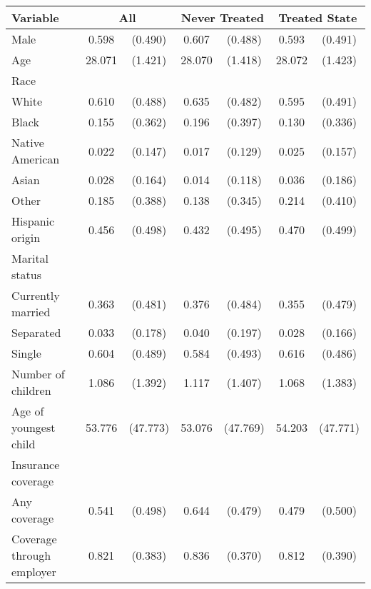 \begin{tabular}{lcccccc}
\toprule
\toprule
 Variable & \multicolumn{2}{c}{All} & \multicolumn{2}{c}{Never Treated} & \multicolumn{2}{c}{Treated State} \\
\midrule 
 Male  & 0.598 & (0.490)  & 0.607 & (0.488)  & 0.593 & (0.491)  \\
 Age  & 28.071 & (1.421)  & 28.070 & (1.418)  & 28.072 & (1.423)  \\
 Race  & & &  \\
 \hspace{0.3cm}  White  & 0.610 & (0.488)  & 0.635 & (0.482)  & 0.595 & (0.491)  \\
 \hspace{0.3cm}  Black  & 0.155 & (0.362)  & 0.196 & (0.397)  & 0.130 & (0.336)  \\
 \hspace{0.3cm}  Native American  & 0.022 & (0.147)  & 0.017 & (0.129)  & 0.025 & (0.157)  \\
 \hspace{0.3cm}  Asian  & 0.028 & (0.164)  & 0.014 & (0.118)  & 0.036 & (0.186)  \\
 \hspace{0.3cm}  Other  & 0.185 & (0.388)  & 0.138 & (0.345)  & 0.214 & (0.410)  \\
 Hispanic origin  & 0.456 & (0.498)  & 0.432 & (0.495)  & 0.470 & (0.499)  \\
 Marital status  & & &  \\
 \hspace{0.3cm} Currently married  & 0.363 & (0.481)  & 0.376 & (0.484)  & 0.355 & (0.479)  \\
 \hspace{0.3cm} Separated  & 0.033 & (0.178)  & 0.040 & (0.197)  & 0.028 & (0.166)  \\
 \hspace{0.3cm} Single  & 0.604 & (0.489)  & 0.584 & (0.493)  & 0.616 & (0.486)  \\
 Number of children  & 1.086 & (1.392)  & 1.117 & (1.407)  & 1.068 & (1.383)  \\
 Age of youngest child  & 53.776 & (47.773)  & 53.076 & (47.769)  & 54.203 & (47.771)  \\
 Insurance coverage  & & &  \\
 \hspace{0.3cm}  Any coverage  & 0.541 & (0.498)  & 0.644 & (0.479)  & 0.479 & (0.500)  \\
 \hspace{0.3cm}  Coverage through employer  & 0.821 & (0.383)  & 0.836 & (0.370)  & 0.812 & (0.390)  \\

\end{tabular}
